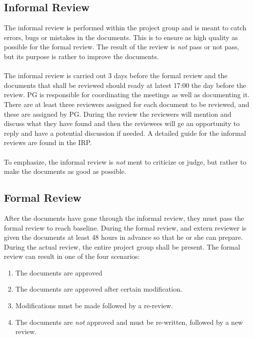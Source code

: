 \documentclass{article}
\begin{document}
    \subsection{Informal Review \label{informalreview}}
        The informal review is performed within the project group and is meant to catch
        errors, bugs or mistakes in the documents. This is to ensure as high quality
        as possible for the formal review. The result of the review is \emph{not} pass or
        not pass, but its purpose is rather to improve the documents.
        \\ \\
        The informal review is carried out 3 days before the formal review and the documents that
        shall be reviewed should ready at latest 17:00 the day before the review.    PG is responsible
        for coordinating the meetings as well as documenting it.
        There are at least three reviewers assigned for each document to be reviewed, and these
        are assigned by PG. During the review the reviewers will mention and discuss what they have
        found and then the reviewees will ge an opportunity to reply and have a potential discussion
        if needed. A detailed guide for the informal reviews are found in the IRP. 
        \\ \\
        To emphasize, the informal review is \emph{not} ment to criticize or judge, but rather
        to make the documents as good as possible. 
        
    
    \subsection{Formal Review \label{formalreview}}
        After the documents have gone through the informal review, they must pass the formal review
        to reach baseline. During the formal review, and extern reviewer is
        given the documents at least 48 hours in advance so that he or she can prepare.
        During the actual review, the entire project group shall be present.
        The formal review can result in one of the four scenarios:
        \begin{enumerate}
            \item The documents are approved
            \item The documents are approved after certain modification.
            \item Modifications must be made followed by a re-review.
            \item The documents are \emph{not} approved and must be re-written,
                    followed by a new review.
        \end{enumerate}
    
\end{document}
